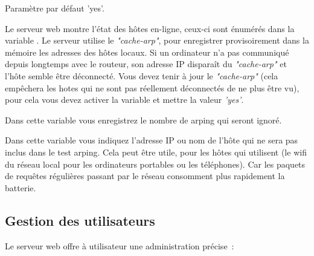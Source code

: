 \begin{description}
{    Paramètre par défaut 'yes'.}


    {Le serveur web montre l'état des hôtes en-ligne, ceux-ci sont énumérés dans
    la variable . Le serveur utilise le \emph{"cache-arp"}, pour
    enregistrer provisoirement dans la mémoire les adresses des hôtes locaux.
    Si un ordinateur n'a pas communiqué depuis longtemps avec le routeur, son
    adresse IP disparaît du \emph{"cache-arp"} et l'hôte semble être déconnecté.
    Vous devez tenir à jour le \emph{"cache-arp"} (cela empêchera les hotes qui
    ne sont pas réellement déconnectés de ne plus être vu), pour cela vous devez
    activer la variable  et mettre la valeur \emph{'yes'}.}

  {Dans cette variable vous enregistrez le nombre de arping qui seront ignoré.}

  {Dans cette variable vous indiquez l'adresse IP ou nom de l'hôte qui ne sera
  pas inclus dans le test arping. Cela peut être utile, pour les hôtes qui
  utilisent (le wifi du réseau local pour les ordinateurs portables ou les téléphones).
  Car les paquets de requêtes régulières passant par le réseau consomment plus
  rapidement la batterie.}
\end{description}

\subsection{Gestion des utilisateurs}

  Le serveur web offre à utilisateur une administration précise~:

